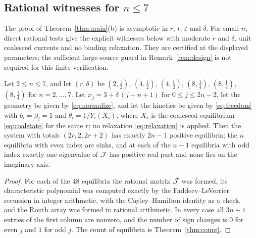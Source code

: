 \subsection{Rational witnesses for \texorpdfstring{\(n\le7\)}{n at most 7}}
The proof of Theorem~\ref{thm:main}(b) is asymptotic in \(r\), \(t\), \(\varepsilon\) and
\(\delta\). For small \(n\), direct rational tests give the explicit witnesses below
with moderate \(r\) and \(\delta\), unit coalesced currents and no binding relaxation.
They are certified at the displayed parameters; the sufficient large-source guard
in Remark~\ref{rem:design} is not required for this finite verification.

\begin{proposition}\label{prop:witness}
Let \(2\le n\le7\), and let \((r,\delta)\) be \((2,\tfrac12)\), \((4,\tfrac12)\),
\((4,\tfrac12)\), \((8,\tfrac14)\), \((8,\tfrac14)\), \((8,\tfrac14)\) for \(n=2,\dots,7\). Let
\(x_j=3+\delta\,(j-n+1)\) for \(0\le j\le2n-2\), let the geometry be given by
\eqref{eq:normalize}, and let the kinetics be given by \eqref{eq:freedom} with
\(b_i=\beta_i=1\) and \(\theta_i=1/Y_i(X_\circ)\), where \(X_\circ\) is the coalesced
equilibrium \eqref{eq:coalstate} for the same \(r\); no relaxation \eqref{eq:relaxation} is
applied. Then the system with totals \((2r,2,2r+2)\) has exactly \(2n-1\) positive equilibria;
the \(n\) equilibria with even index are sinks, and at each of the \(n-1\) equilibria with odd
index exactly one eigenvalue of \(\mathcal J\) has positive real part and none lies on the imaginary
axis.
\end{proposition}
\begin{proof}
For each of the \(48\) equilibria the rational matrix \(\mathcal J\) was formed, its characteristic
polynomial was computed exactly by the Faddeev--LeVerrier recursion in integer arithmetic, with
the Cayley--Hamilton identity as a check, and the Routh array \cite[Ch.~XV]{Gantmacher} was
formed in rational arithmetic. In every case all \(3n+1\) entries of the first column are
nonzero, and the number of sign changes is \(0\) for even \(j\) and \(1\) for odd \(j\). The
count of equilibria is Theorem~\ref{thm:count}.
\end{proof}

